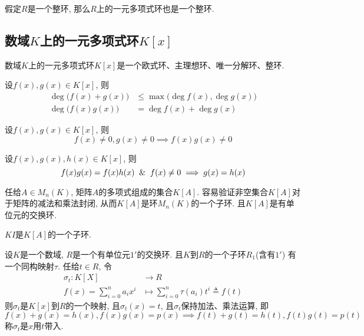 \begin{Proposition}
假定$R$是一个整环, 那么$R$上的一元多项式环也是一个整环.
\end{Proposition}

\subsection{数域$K$上的一元多项式环$K[x]$} %

\begin{Note}
数域$K$上的一元多项式环$K[x]$是一个欧式环、主理想环、唯一分解环、整环.
\end{Note}

\begin{Property}
设$f(x), g(x) \in K[x]$, 则
\[
\begin{aligned}
\deg \Big( f(x) + g(x) \Big) &\le \max \Big( \deg f(x), \deg g(x) \Big) \\
\deg \Big( f(x) g(x) \Big) &= \deg f(x) + \deg g(x) 
\end{aligned}
\]
\end{Property}

\begin{Corollary}
设$f(x), g(x) \in K[x]$, 则
\[
f(x) \neq 0, g(x) \neq 0 \implies f(x) g(x) \neq 0
\]
\end{Corollary}

\begin{Corollary}[消去律]
设$f(x), g(x), h(x) \in K[x]$, 则
\[
f(x) g(x) = f(x) h(x) \And f(x) \neq 0 \implies g(x) = h(x)
\]
\end{Corollary}

\begin{Note}
任给$A \in M_n(K)$, 矩阵$A$的多项式组成的集合$K[A]$. 容易验证非空集合$K[A]$对于矩阵的减法和乘法封闭, 从而$K[A]$是环$M_n(K)$的一个子环. 且$K[A]$是有单位元的交换环.
\end{Note}

\begin{Note}
$KI$是$K[A]$的一个子环.
\end{Note}

\begin{Theorem}[一元多项式环的通用性质]
设$K$是一个数域, $R$是一个有单位元$1'$的交换环. 且$K$到$R$的一个子环$R_1$(含有$1'$)
有一个同构映射$\tau$. 任给$t \in R$, 令
\[
\begin{aligned}
\sigma_t: K[X] &\rightarrow R \\
          f(x) = \sum\limits_{i=0}^n a_i x^i &\mapsto \sum\limits_{i=0}^n \tau(a_i) t^i \triangleq f(t)
\end{aligned}
\]
则$\sigma_t$是$K[x]$到$R$的一个映射, 且$\sigma_t(x) = t$, 且$\sigma_t$保持加法、乘法运算, 即
\[
f(x) +g(x) = h(x), f(x)g(x) = p(x) \implies f(t) + g(t) = h(t), f(t) g(t) = p(t)
\]
称$\sigma_t$是$x$用$t$带入.
\end{Theorem}

